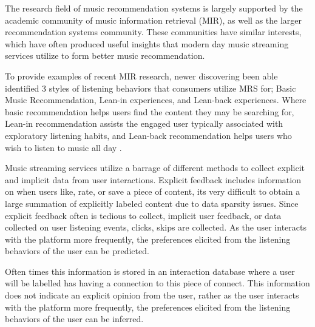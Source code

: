 The research field of music recommendation systems is largely supported by the academic community of music information retrieval (MIR), as well as the larger recommendation systems community. These communities have similar interests, which have often produced useful insights that modern day music streaming services utilize to form better music recommendation.

To provide examples of recent MIR research, newer discovering been able identified 3 styles of listening behaviors that consumers utilize MRS for; Basic Music Recommendation, Lean-in experiences, and Lean-back experiences. Where basic recommendation helps users find the content they may be searching for, Lean-in recommendation assists the engaged user typically associated with exploratory listening habits, and Lean-back recommendation helps users who wish to listen to music all day \cite{schedl2022music}. 

Music streaming services utilize a barrage of different methods to collect explicit and implicit data from user interactions. Explicit feedback includes information on when users like, rate, or save a piece of content, its very difficult to obtain a large summation of explicitly labeled content due to data sparsity issues. Since explicit feedback often is tedious to collect, implicit user feedback, or data collected on user listening events, clicks, skips are collected. As the user interacts with the platform more frequently, the preferences elicited from the listening behaviors of the user can be predicted. 

Often times this information is stored in an interaction database where a user will be labelled has having a connection to this piece of connect. This information does not indicate an explicit opinion from the user, rather as the user interacts with the platform more frequently, the preferences elicited from the listening behaviors of the user can be inferred. 


